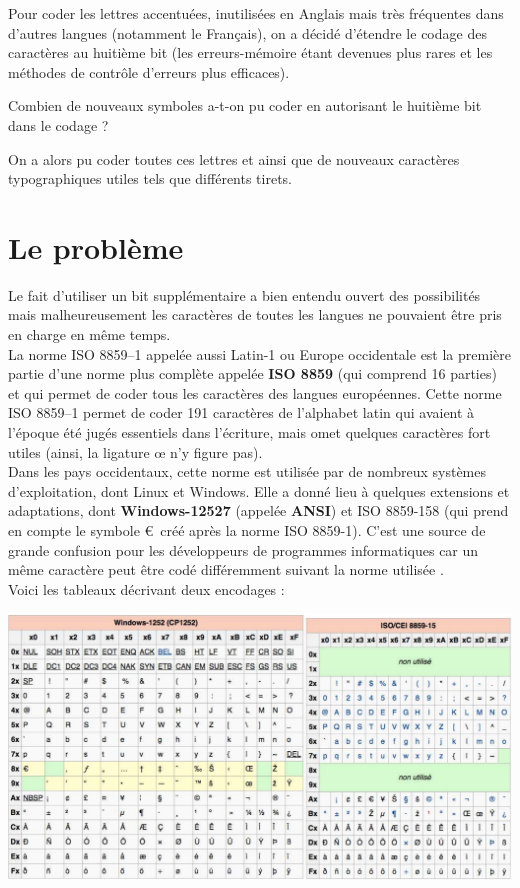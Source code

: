 Pour coder les lettres accentuées, inutilisées en Anglais mais très fréquentes dans d'autres langues (notamment le Français), on a décidé
d'étendre
le codage des caractères au huitième bit (les erreurs-mémoire étant devenues plus rares et les méthodes de contrôle d'erreurs plus efficaces).\\


\begin{exercice}[]
    Combien de nouveaux symboles a-t-on pu coder en autorisant le huitième bit dans le codage ?
\end{exercice}


On a alors pu coder toutes ces lettres et ainsi que de nouveaux caractères typographiques utiles tels que différents tirets.\\


\section{Le problème}

Le fait d'utiliser un bit supplémentaire a bien entendu ouvert des possibilités mais malheureusement les caractères de toutes les langues ne
pouvaient être pris en charge
en même temps.\\
La norme ISO 8859–1 appelée aussi Latin-1 ou Europe occidentale est la première partie d'une norme plus complète appelée \textbf{ISO 8859} (qui
comprend 16 parties)
et qui permet de coder tous les caractères des langues européennes. Cette norme ISO 8859–1 permet de coder 191 caractères de l'alphabet latin qui
avaient à
l'époque été jugés essentiels dans l'écriture, mais omet quelques caractères fort utiles (ainsi, la ligature œ n'y figure pas).\\

Dans les pays occidentaux, cette norme est utilisée par de nombreux systèmes d'exploitation, dont Linux et Windows. Elle a donné lieu à quelques
extensions
et adaptations, dont \textbf{Windows-12527} (appelée \textbf{ANSI}) et ISO 8859-158 (qui prend en compte le symbole €\  créé après la norme
ISO 8859-1).
C'est une source de grande confusion pour les développeurs de programmes informatiques car un même caractère peut être codé différemment suivant
la norme utilisée .\\
Voici les tableaux décrivant deux encodages :

\includegraphics[width=\columnwidth]{ch-texte/img/W1252andISO}\\


